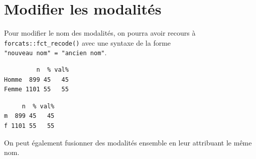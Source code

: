 \documentclass[
  letterpaper,
  DIV=11,
  numbers=noendperiod,
  oneside]{scrreprt}
\newenvironment{Shaded}{\begin{snugshade}}{\end{snugshade}}
\newcommand{\AttributeTok}[1]{\textcolor[rgb]{0.40,0.45,0.13}{#1}}
\newcommand{\FunctionTok}[1]{\textcolor[rgb]{0.28,0.35,0.67}{#1}}
\newcommand{\NormalTok}[1]{\textcolor[rgb]{0.00,0.23,0.31}{#1}}
\newcommand{\OtherTok}[1]{\textcolor[rgb]{0.00,0.23,0.31}{#1}}
\newcommand{\SpecialCharTok}[1]{\textcolor[rgb]{0.37,0.37,0.37}{#1}}
\newcommand{\StringTok}[1]{\textcolor[rgb]{0.13,0.47,0.30}{#1}}
\begin{document}
\hypertarget{sec-modifier-modalites}{%
\section{Modifier les modalités}\label{sec-modifier-modalites}}

Pour modifier le nom des modalités, on pourra avoir recours à
\texttt{forcats::fct\_recode()} avec une syntaxe de la forme
\texttt{"nouveau\ nom"\ =\ "ancien\ nom"}.

\begin{Shaded}
\end{Shaded}

\begin{verbatim}
         n  % val%
Homme  899 45   45
Femme 1101 55   55
\end{verbatim}

\begin{Shaded}
\end{Shaded}

\begin{verbatim}
     n  % val%
m  899 45   45
f 1101 55   55
\end{verbatim}

On peut également fusionner des modalités ensemble en leur attribuant le
même nom.

\begin{Shaded}
\end{Shaded}
\end{document}
